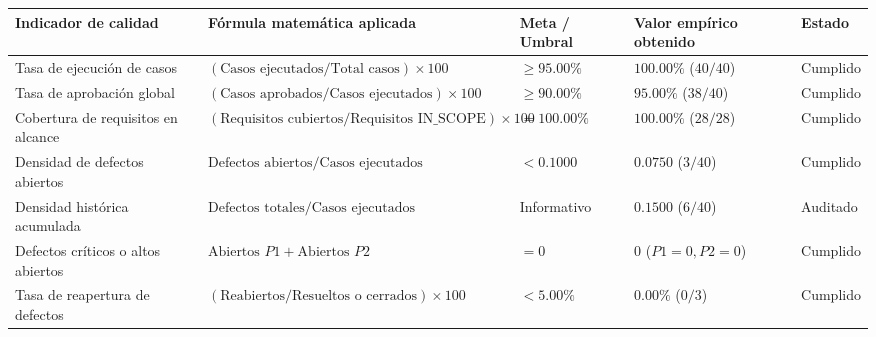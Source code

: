 \documentclass[stu,12pt,a4paper]{apa7}
\newcounter{none}
\begin{document}
{\def\LTcaptype{none} %
\begin{longtable}[]{@{}
  >{\raggedright\arraybackslash}p{}
  >{\raggedright\arraybackslash}p{}
  >{\raggedright\arraybackslash}p{}
  >{\raggedright\arraybackslash}p{}
  >{\raggedright\arraybackslash}p{}@{}}
\toprule\noalign{}
\begin{minipage}[b]{\linewidth}\raggedright
Indicador de calidad
\end{minipage} & \begin{minipage}[b]{\linewidth}\raggedright
Fórmula matemática aplicada
\end{minipage} & \begin{minipage}[b]{\linewidth}\raggedright
Meta / Umbral
\end{minipage} & \begin{minipage}[b]{\linewidth}\raggedright
Valor empírico obtenido
\end{minipage} & \begin{minipage}[b]{\linewidth}\raggedright
Estado
\end{minipage} \\
\midrule\noalign{}
\endhead
\bottomrule\noalign{}
\endlastfoot
Tasa de ejecución de casos & \((\text{Casos ejecutados} / \text{Total casos}) \times 100\) & \(\ge 95.00\%\) & \(100.00\%\) (\(40 / 40\)) & Cumplido \\
Tasa de aprobación global & \((\text{Casos aprobados} / \text{Casos ejecutados}) \times 100\) & \(\ge 90.00\%\) & \(95.00\%\) (\(38 / 40\)) & Cumplido \\
Cobertura de requisitos en alcance & \((\text{Requisitos cubiertos} / \text{Requisitos IN\_SCOPE}) \times 100\) & \(= 100.00\%\) & \(100.00\%\) (\(28 / 28\)) & Cumplido \\
Densidad de defectos abiertos & \(\text{Defectos abiertos} / \text{Casos ejecutados}\) & \(< 0.1000\) & \(0.0750\) (\(3 / 40\)) & Cumplido \\
Densidad histórica acumulada & \(\text{Defectos totales} / \text{Casos ejecutados}\) & Informativo & \(0.1500\) (\(6 / 40\)) & Auditado \\
Defectos críticos o altos abiertos & \(\text{Abiertos } P1 + \text{Abiertos } P2\) & \(= 0\) & \(0\) (\(P1 = 0, P2 = 0\)) & Cumplido \\
Tasa de reapertura de defectos & \((\text{Reabiertos} / \text{Resueltos o cerrados}) \times 100\) & \(< 5.00\%\) & \(0.00\%\) (\(0 / 3\)) & Cumplido \\
\end{longtable}
}
\end{document}
